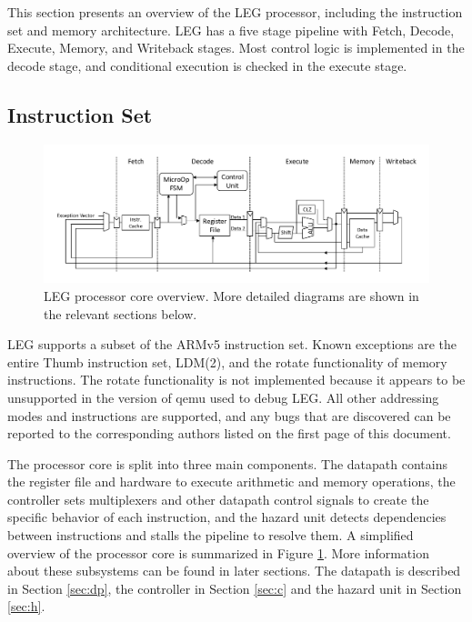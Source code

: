 This section presents an overview of the LEG processor, including the instruction set and memory architecture.
LEG has a five stage pipeline with Fetch, Decode, Execute, Memory, and Writeback stages.
Most control logic is implemented in the decode stage, and conditional execution is checked in the execute stage.

\subsection{Instruction Set}
\begin{figure}[h!]
\centering
\includegraphics[width=\textwidth]{./diagrams/datapath_simple.pdf}
\caption{LEG processor core overview. More detailed diagrams are shown in the relevant sections below.}
\label{fig:core}
\end{figure}


LEG supports a subset of the ARMv5 instruction set. 
Known exceptions are the entire Thumb instruction set, LDM(2), and the rotate functionality of memory instructions.
The rotate functionality is not implemented because it appears to be unsupported in the version of qemu used to debug LEG.
All other addressing modes and instructions are supported, and any bugs that are discovered can be reported to the corresponding authors listed on the first page of this document.

The processor core is split into three main components.
The datapath contains the register file and hardware to execute arithmetic and memory operations, the controller sets multiplexers and other datapath control signals to create the specific behavior of each instruction, and the hazard unit detects dependencies between instructions and stalls the pipeline to resolve them.
A simplified overview of the processor core is summarized in Figure \ref{fig:core}.
More information about these subsystems can be found in later sections.
The datapath is described in Section \ref{sec:dp}, the controller in Section \ref{sec:c} and the hazard unit in Section \ref{sec:h}.

